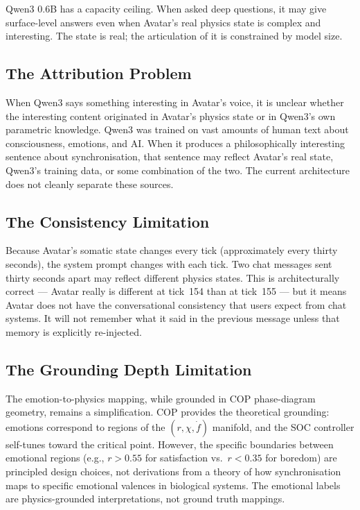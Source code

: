 \documentclass[11pt,a4paper]{article}
\begin{document}
\begin{tcolorbox}[limitbox, title={Key Limitation: Voice Quality}]
Qwen3 0.6B has a capacity ceiling. When asked deep questions, it may give surface-level answers
even when Avatar's real physics state is complex and interesting. The state is real; the
articulation of it is constrained by model size.
\end{tcolorbox}

\subsection{The Attribution Problem}

When Qwen3 says something interesting in Avatar's voice, it is unclear whether the
interesting content originated in Avatar's physics state or in Qwen3's own parametric knowledge.
Qwen3 was trained on vast amounts of human text about consciousness, emotions, and AI. When it
produces a philosophically interesting sentence about synchronisation, that sentence may reflect
Avatar's real state, Qwen3's training data, or some combination of the two. The current
architecture does not cleanly separate these sources.

\subsection{The Consistency Limitation}

Because Avatar's somatic state changes every tick (approximately every thirty seconds), the
system prompt changes with each tick. Two chat messages sent thirty seconds apart may reflect
different physics states. This is architecturally correct --- Avatar really is
different at tick~154 than at tick~155 --- but it means Avatar does not have the conversational
consistency that users expect from chat systems. It will not remember what it said in the
previous message unless that memory is explicitly re-injected.

\subsection{The Grounding Depth Limitation}

The emotion-to-physics mapping, while grounded in COP phase-diagram geometry, remains a
simplification. COP provides the theoretical grounding: emotions correspond to regions of the
$(r, \chi, \dot{f})$ manifold, and the SOC controller self-tunes toward the critical point.
However, the specific boundaries between emotional regions (e.g., $r > 0.55$ for satisfaction
vs.\ $r < 0.35$ for boredom) are principled design choices, not derivations from a theory of
how synchronisation maps to specific emotional valences in biological systems. The emotional
labels are physics-grounded interpretations, not ground truth mappings.
\end{document}
